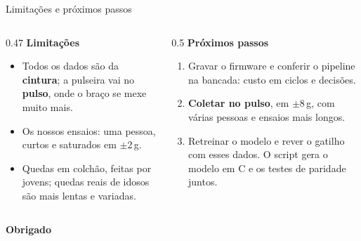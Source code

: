 \documentclass[aspectratio=169,10pt]{beamer}
\begin{document}
\begin{frame}{Limitações e próximos passos}
  \begin{columns}[T,onlytextwidth]
    \begin{column}{0.47\textwidth}
      \textbf{\color{uspblue}Limitações}
      \begin{itemize}
        \item Todos os dados são da \textbf{cintura}; a pulseira vai no \textbf{pulso}, onde o braço se mexe muito
              mais.
        \item Os nossos ensaios: uma pessoa, curtos e saturados em $\pm$2\,g.
        \item Quedas em colchão, feitas por jovens; quedas reais de idosos são mais lentas e variadas.
      \end{itemize}
    \end{column}
    \begin{column}{0.5\textwidth}
      \textbf{\color{uspblue}Próximos passos}
      \begin{enumerate}
        \item Gravar o firmware e conferir o pipeline na bancada: custo em ciclos e decisões.
        \item \textbf{Coletar no pulso}, em $\pm$8\,g, com várias pessoas e ensaios mais longos.
        \item Retreinar o modelo e rever o gatilho com esses dados. O script gera o modelo em C e os testes de
              paridade juntos.
      \end{enumerate}
    \end{column}
  \end{columns}
\end{frame}

\begin{frame}[plain]
  \centering
  \vspace{3.2cm}
  {\Huge\bfseries\color{uspblue} Obrigado}
\end{frame}
\end{document}
